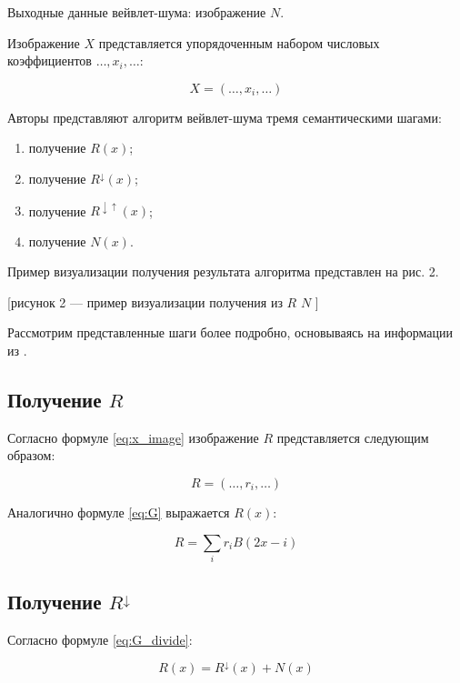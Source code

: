 Выходные данные вейвлет-шума: изображение $N$.

Изображение $X$ представляется упорядоченным набором числовых коэффициентов $\dots,x_i,\dots$:

\begin{equation}\label{eq:x_image}
	X=(\dots,x_i,\dots)
\end{equation}

Авторы \cite{pixar} представляют алгоритм вейвлет-шума тремя семантическими шагами:

\begin{enumerate}
	\item получение $R(x)$;%
	\item получение $R^\downarrow(x)$;%
	\item получение $R^{\downarrow\uparrow}(x)$;%
	\item получение $N(x)$.%
\end{enumerate}

Пример визуализации получения результата алгоритма представлен на рис. 2.

[рисунок 2 --- пример визуализации получения из $R$ $N$ \cite{pixar}]

Рассмотрим представленные шаги более подробно, основываясь на информации из \cite{pixar}.

\subsection{Получение $R$}

Согласно формуле \ref{eq:x_image} изображение $R$ представляется следующим образом:

\begin{equation}\label{eq:R_image}
	R=(\dots,r_i,\dots)
\end{equation}

Аналогично формуле \ref{eq:G} выражается $R(x)$:

\begin{equation}\label{eq:R}
	R=\sum_{i}r_i B(2x-i)
\end{equation}

\subsection{Получение $R^\downarrow$}

Согласно формуле \ref{eq:G_divide}:

\begin{equation}\label{eq:R_divide}
	R(x)=R^{\downarrow}(x)+N(x)
\end{equation}

